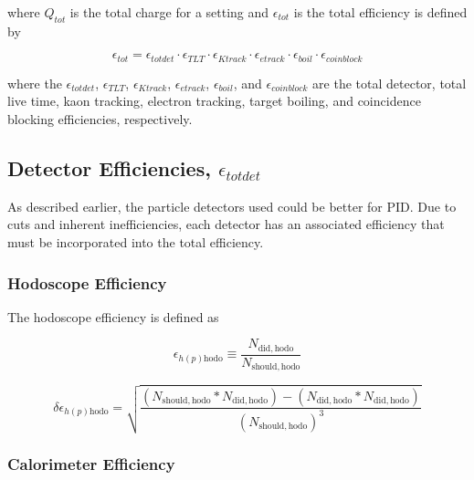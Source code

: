 \documentclass[
]{report}
\begin{document}
\noindent where \(Q_{tot}\) is the total charge for a setting and
\(\epsilon_{tot}\) is the total efficiency is defined by

\begin{equation} 
  \epsilon_{tot}=\epsilon_{tot det}\cdot\epsilon_{TLT}\cdot\epsilon_{K track}\cdot\epsilon_{e track}\cdot\epsilon_{boil}\cdot\epsilon_{coinblock}
  \label{eq:tot_eff} 
\end{equation}

\noindent where the \(\epsilon_{tot det}\), \(\epsilon_{TLT}\),
\(\epsilon_{K track}\), \(\epsilon_{e track}\), \(\epsilon_{boil}\), and
\(\epsilon_{coinblock}\) are the total detector, total live time, kaon
tracking, electron tracking, target boiling, and coincidence blocking
efficiencies, respectively.

\hypertarget{detector-efficiencies-epsilon_tot-det}{%
\subsection{\texorpdfstring{Detector Efficiencies,
\(\epsilon_{tot det}\)}{Detector Efficiencies, \textbackslash epsilon\_\{tot det\}}}\label{detector-efficiencies-epsilon_tot-det}}

As described earlier, the particle detectors used could be better for
PID. Due to cuts and inherent inefficiencies, each detector has an
associated efficiency that must be incorporated into the total
efficiency.

\hypertarget{hodoscope-efficiency}{%
\subsubsection{Hodoscope Efficiency}\label{hodoscope-efficiency}}

The hodoscope efficiency is defined as

\begin{equation} 
  \epsilon_{h(p)\mathrm{hodo}}\equiv\frac{N_{\mathrm{did,hodo}}}{N_{\mathrm{should,hodo}}}
  \label{eq:hodo_eff} 
\end{equation}

\begin{equation}   \delta\epsilon_{h(p)\mathrm{hodo}}=\sqrt{\frac{(N_{\mathrm{should,hodo}}*N_{\mathrm{did,hodo}})-(N_{\mathrm{did,hodo}}*N_{\mathrm{did,hodo}})}{(N_{\mathrm{should,hodo}})^3}}
  \label{eq:hodo_eff_error} 
\end{equation}

\hypertarget{calorimeter-efficiency}{%
\subsubsection{Calorimeter Efficiency}\label{calorimeter-efficiency}}
\end{document}
